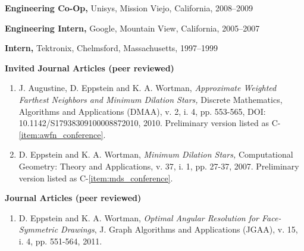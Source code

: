 \documentclass[11pt]{letter}
\begin{document}
\textbf{Engineering Co-Op,} Unisys, Mission Viejo, California, 2008--2009 %

\textbf{Engineering Intern,} Google, Mountain View, California, 2005--2007 %

\textbf{Intern,} Tektronix, Chelmsford, Massachusetts, 1997--1999 %

\clearpage
{}

\renewcommand{\labelenumi}{I-\arabic{enumi}.}
\textbf{Invited Journal Articles (peer reviewed)}
\begin{enumerate}
\item \label{item:awfn_journal} J. Augustine, D. Eppstein and K. A. Wortman, \emph{Approximate Weighted Farthest Neighbors and Minimum Dilation Stars,} Discrete Mathematics, Algorithms and Applications (DMAA), v. 2, i. 4, pp. 553-565, DOI: 10.1142/S17938309100008872010, 2010.  Preliminary version listed as C-\ref{item:awfn_conference}.
\item \label{item:mds_journal} D. Eppstein and K. A. Wortman, \emph{Minimum Dilation Stars,} Computational Geometry: Theory and Applications, v. 37, i. 1, pp. 27-37, 2007.  Preliminary version listed as C-\ref{item:mds_conference}.
\end{enumerate} 

\renewcommand{\labelenumi}{J-\arabic{enumi}.}
\textbf{Journal Articles (peer reviewed)}
\begin{enumerate}
\item \label{item:oarpdsf_journal} D. Eppstein and K. A. Wortman, \emph{Optimal Angular Resolution for Face-Symmetric Drawings}, J. Graph Algorithms and Applications (JGAA), v. 15, i. 4, pp. 551-564, 2011.
\end{enumerate}
\end{document}
